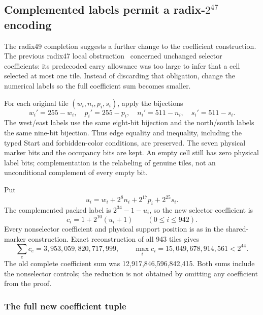 \subsection{Complemented labels permit a radix-$2^{47}$ encoding}

The radix49 completion suggests a further change to the coefficient
construction. The previous radix47 local obstruction~\cite{radix47obstruction}
concerned unchanged selector coefficients: its predecoded carry allowance
was too large to infer that a cell selected at most one tile. Instead of
discarding that obligation, change the numerical labels so the full
coefficient sum becomes smaller.

For each original tile $(w_i,n_i,p_i,s_i)$, apply the bijections
\[
 w_i'=255-w_i,\quad p_i'=255-p_i,\quad
 n_i'=511-n_i,\quad s_i'=511-s_i.
\]
The west/east labels use the same eight-bit bijection and the north/south
labels the same nine-bit bijection. Thus edge equality and inequality,
including the typed Start and forbidden-color conditions, are preserved.
The seven physical marker bits and the occupancy bits are kept. An empty
cell still has zero physical label bits; complementation is the relabeling
of genuine tiles, not an unconditional complement of every empty bit.

Put
\[
 u_i=w_i+2^8n_i+2^{17}p_i+2^{25}s_i.
\]
The complemented packed label is $2^{34}-1-u_i$, so the new selector
coefficient is
\begin{equation}\label{eq:complement}
 c_i=1+2^{10}(u_i+1)\qquad(0\le i\le942).
\end{equation}
Every nonselector coefficient and physical support position is as in the
shared-marker construction. Exact reconstruction of all 943 tiles gives
\[
 \sum_e c_e=3,953,059,820,717,999,
 \qquad\max_i c_i=15,049,678,914,561<2^{44}.
\]
The old complete coefficient sum was 12,917,846,596,842,415. Both sums
include the nonselector controls; the reduction is not obtained by
omitting any coefficient from the proof.

\subsubsection*{The full new coefficient tuple}

